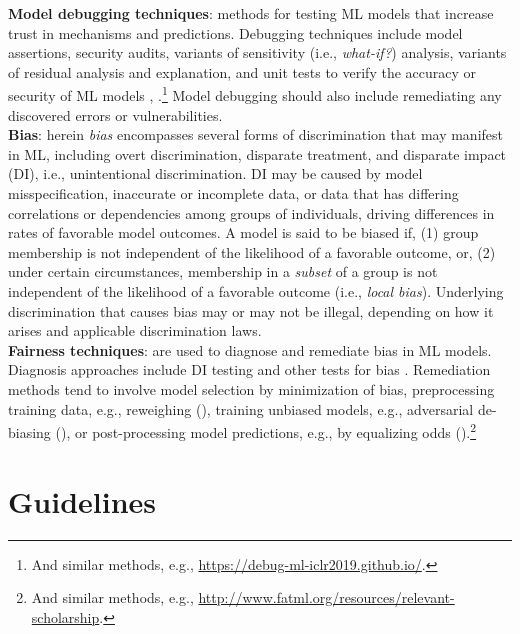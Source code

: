 \documentclass[sigconf]{acmart}
\begin{document}
\vspace{-8pt}
\noindent\textbf{Model debugging techniques}: methods for testing ML models that increase trust in mechanisms and predictions. Debugging techniques include model assertions, security audits, variants of sensitivity (i.e., \textit{what-if?}) analysis, variants of residual analysis and explanation, and unit tests to verify the accuracy or security of ML models \cite{modeltracker}, \cite{kangdebugging}.\footnote{And similar methods, e.g., \url{https://debug-ml-iclr2019.github.io/}.} Model debugging should also include remediating any discovered errors or vulnerabilities.\\

\vspace{-8pt}
\noindent\textbf{Bias}: herein \textit{bias} encompasses several forms of discrimination that may manifest in ML, including overt discrimination, disparate treatment, and disparate impact (DI), i.e., unintentional discrimination. DI may be caused by model misspecification, inaccurate or incomplete data, or data that has differing correlations or dependencies among groups of individuals, driving differences in rates of favorable model outcomes.  A model is said to be biased if, (1) group membership is not independent of the likelihood of a favorable outcome, or, (2) under certain circumstances, membership in a \textit{subset} of a group is not independent of the likelihood of a favorable outcome (i.e., \textit{local bias}). Underlying discrimination that causes bias may or may not be illegal, depending on how it arises and applicable discrimination laws.\\

\vspace{-8pt}
\noindent\textbf{Fairness techniques}: are used to diagnose and remediate bias in ML models. Diagnosis approaches include DI testing and other tests for bias \cite{feldman2015certifying}. Remediation methods tend to involve model selection by minimization of bias, preprocessing training data, e.g., reweighing (\citet{kamiran2012data}), training unbiased models, e.g., adversarial de-biasing (\citet{zhang2018mitigating}), or post-processing model predictions, e.g., by equalizing odds (\citet{hardt2016equality}).\footnote{And similar methods, e.g., \url{http://www.fatml.org/resources/relevant-scholarship}.} 

\section{Guidelines}
\end{document}

